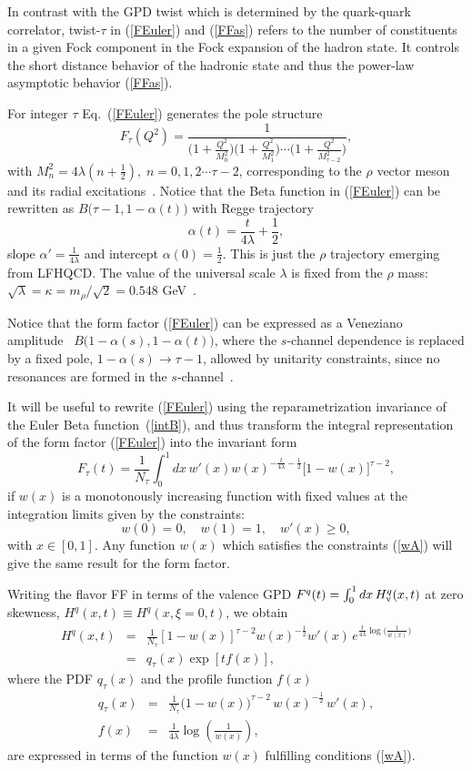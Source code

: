 \documentclass[aps,prl,reprint,groupedaddress, preprintnumbers]{revtex4-1}
\def\be{\begin{equation}}
\def\ee{\end{equation}}
\def\bea{\begin{eqnarray}}
\def\eea{\end{eqnarray}}
\newcommand{\half}{{\frac{1}{2}}}
\newcommand{\req}[1]{(\ref{#1})}
\begin{document}
In contrast with the GPD twist which is determined by the quark-quark correlator,  twist-$\tau$
in \req{FEuler} and \req{FFas}  refers to the number of constituents in a given Fock component in the Fock expansion of the hadron state. It  controls the short distance behavior of the hadronic state and thus the power-law asymptotic behavior \req{FFas}.


For integer $\tau$ Eq.~\req{FEuler} generates the pole structure~\cite{Brodsky:2007hb}
\be\label{Ftau}
 F_\tau(Q^2) =  \frac{1}{{\Big(1 + \frac{Q^2}{M^2_0} \Big) }
 \Big(1 + \frac{Q^2}{M^2_{1}}  \Big)  \cdots
 \Big(1  + \frac{Q^2}{M^2_{{\tau-2}}} \Big)} ,
\ee
with $M_n^2 = 4  \lambda  \left(n+\half \right), \; n=0, 1, 2 \cdots {\tau-2}$, corresponding to the $\rho$ vector meson and its radial excitations~\cite{Brodsky:2014yha}. Notice that the Beta function in \req{FEuler} can be rewritten as $B\big(\tau - 1, 1 - \alpha(t)\big)$ with Regge trajectory
\be \label{VMRT}
\alpha(t) = \frac{t}{4 \lambda} + \half,
\ee
slope $\alpha' = \frac{1}{4 \lambda}$ and intercept $\alpha(0) = \half$.  This is just the $\rho$ trajectory emerging from LFHQCD.  The value of the universal scale $\lambda$ is fixed from the $\rho$ mass: $\sqrt{\lambda} = \kappa = m_\rho/ \sqrt{2} = 0.548$ GeV~\cite{Brodsky:2014yha, Brodsky:2016yod}.


Notice that the form factor \req{FEuler} can be expressed as a Veneziano amplitude~\cite{Veneziano:1968yb} $B\big(1 - \alpha(s), 1 - \alpha(t)\big)$, where the $s$-channel dependence is replaced by a fixed pole, $1 - \alpha(s) \to \tau -1$, allowed by unitarity constraints, since no resonances are formed in the $s$-channel~\cite{Bender:1970ew}.


It will be useful to rewrite \req{FEuler} using the  reparametrization invariance  of the Euler Beta function~\req{intB}, and thus transform the integral representation of the form factor \req{FEuler} into the invariant form
\be
F_\tau(t) = \frac{1}{N_\tau}  \int_0^1 dx \, w'(x) w(x)^{- \frac{t}{4 \lambda} - \half} \big[1- w(x)\big]^{\tau-2},
\ee
if $w(x)$ is a monotonously  increasing function with fixed values at the integration limits  given by the constraints:
\be \label{wA}
 w(0) = 0, \quad w(1) = 1, \quad  w'(x) \ge 0,
\ee
 with $x \in [0,1]$. Any function $w(x)$ which satisfies the constraints \req{wA} will give the same result for the form factor.


Writing the flavor FF in terms of the valence GPD $F^q(t) = \int_0^1 dx\,  H^q_{\rm v}(x,t)$ at zero skewness, $ H^q(x,t) \equiv  H^q(x, \xi = 0, t)$, we obtain
\bea \label{GPDexp}
H^q(x,t) &=&\frac{1}{N_\tau}[1-w(x)]^{\tau-2}w(x)^{-\frac{1}{2}}w'(x) \, e^{\frac{t}{4\lambda}\log\big(\frac{1}{w(x)}\big)}\nonumber\\
&=&q_\tau(x)\exp[tf(x)],
\eea
where the PDF $q_\tau(x)$ and the profile function $f(x)$
\bea \label{qx} 
q_\tau(x) &=& \frac{1}{N_\tau} \big(1- w(x)\big)^{\tau-2}\, w(x)^{- \half}\, w'(x), \\
 \label{fx}
f(x) &=& \frac{1}{4 \lambda} \log\left(\frac{1}{w(x)}\right), 
\eea
are expressed in terms of the function $w(x)$ fulfilling conditions \req{wA}.
\end{document}
